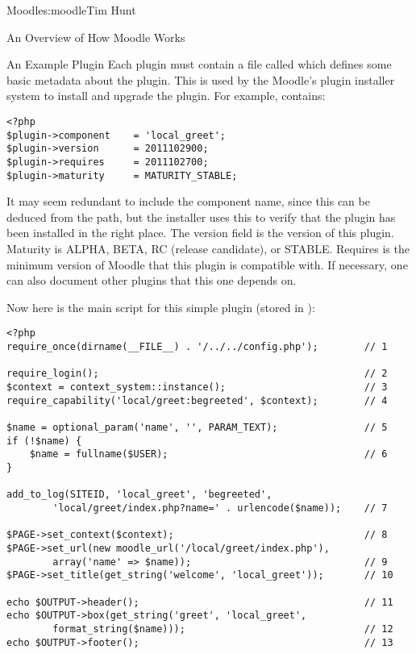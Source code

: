 \begin{aosachapter}{Moodle}{s:moodle}{Tim Hunt}
\begin{aosasect1}{An Overview of How Moodle Works}
\begin{aosasect2}{An Example Plugin}
Each plugin must contain a file called  which
defines some basic metadata about the plugin. This is used by the
Moodle's plugin installer system to install and upgrade the plugin.
For example,  contains:

\begin{verbatim}
<?php
$plugin->component    = 'local_greet';
$plugin->version      = 2011102900;
$plugin->requires     = 2011102700;
$plugin->maturity     = MATURITY_STABLE;
\end{verbatim}

It may seem redundant to include the component name, since this can be
deduced from the path, but the installer uses this to verify that the
plugin has been installed in the right place. The version field is the
version of this plugin. Maturity is ALPHA, BETA, RC (release
candidate), or STABLE. Requires is the minimum version of Moodle that
this plugin is compatible with. If necessary, one can also document
other plugins that this one depends on.

Now here is the main script for this simple plugin (stored in
):

\begin{verbatim}
<?php
require_once(dirname(__FILE__) . '/../../config.php');        // 1

require_login();                                              // 2
$context = context_system::instance();                        // 3
require_capability('local/greet:begreeted', $context);        // 4

$name = optional_param('name', '', PARAM_TEXT);               // 5
if (!$name) {
    $name = fullname($USER);                                  // 6
}

add_to_log(SITEID, 'local_greet', 'begreeted',
        'local/greet/index.php?name=' . urlencode($name));    // 7

$PAGE->set_context($context);                                 // 8
$PAGE->set_url(new moodle_url('/local/greet/index.php'),
        array('name' => $name));                              // 9
$PAGE->set_title(get_string('welcome', 'local_greet'));       // 10

echo $OUTPUT->header();                                       // 11
echo $OUTPUT->box(get_string('greet', 'local_greet',
        format_string($name)));                               // 12
echo $OUTPUT->footer();                                       // 13
\end{verbatim}


\end{aosasect2}
\end{aosasect1}
\end{aosachapter}
